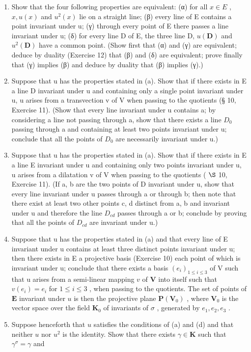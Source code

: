 \begin{enumerate}
\def\labelenumi{(\alph{enumi})}
\item
  Show that the four following properties are equivalent: (α) for all \(x \in E\) , \(x, u(x)\) and \(u^{2}(x)\) lie on a straight line; (β) every line of E contains a point invariant under u; (γ) through every point of E there passes a line invariant under u; (δ) for every line D of E, the three line D, \(u(\mathbf{D})\) and \(u^{2}(\mathbf{D})\) have a common point. (Show first that (α) and (γ) are equivalent; deduce by duality (Exercise 12) that (β) and (δ) are equivalent; prove finally that (γ) implies (β) and deduce by duality that (β) implies (γ).)
\item
  Suppose that u has the properties stated in (a). Show that if there exists in E a line D invariant under u and containing only a single point invariant under u, u arises from a transvection v of V when passing to the quotients (§ 10, Exercise 11). (Show that every line invariant under u contains a; by considering a line not passing through a, show that there exists a line \(D_{0}\) passing through a and containing at least two points invariant under u; conclude that all the points of \(D_{0}\) are necessarily invariant under u.)
\item
  Suppose that u has the properties stated in (a). Show that if there exists in E a line E invariant under u and containing only two points invariant under u, u arises from a dilatation v of V when passing to the quotients ( \(\S\) 10, Exercise 11). (If a, b are the two points of D invariant under u, show that every line invariant under u passes through a or through b; then note that there exist at least two other points c, d distinct from a, b and invariant under u and therefore the line \(D_{cd}\) passes through a or b; conclude by proving that all the points of \(D_{cd}\) are invariant under u.)
\item
  Suppose that u has the properties stated in (a) and that every line of E invariant under u contains at least three distinct points invariant under u; then there exists in E a projective basis (Exercise 10) each point of which is invariant under u; conclude that there exists a basis \((e_{i})_{1\leq i\leq3}\) of V such that u arises from a semi-linear mapping \(v\) of \(\mathbf{V}\) into itself such that \(v(e_i) = e_i\) for \(1 \leqslant i \leqslant 3\) , when passing to the quotients. The set of points of \(\mathbf{E}\) invariant under \(u\) is then the projective plane \(\mathbf{P}(\mathbf{V}_0)\) , where \(\mathbf{V}_0\) is the vector space over the field \(\mathbf{K}_0\) of invariants of \(\sigma\) , generated by \(e_1, e_2, e_3\) .
\item
  Suppose henceforth that \(u\) satisfies the conditions of (a) and (d) and that neither \(u\) nor \(u^2\) is the identity. Show that there exists \(\gamma \in \mathbf{K}\) such that \(\gamma^\sigma = \gamma\) and
\end{enumerate}

